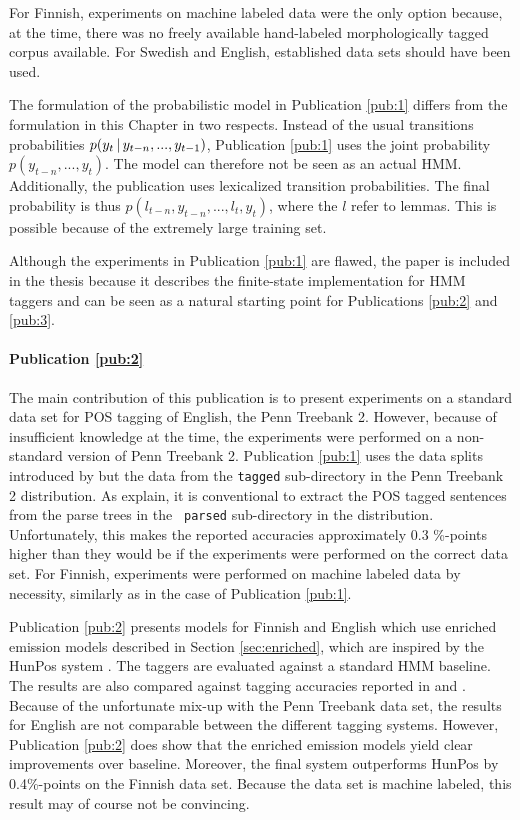 For Finnish, experiments on machine labeled data were the only option
because, at the time, there was no freely available hand-labeled
morphologically tagged corpus available. For Swedish and English,
established data sets should have been used.

The formulation of the probabilistic model in Publication \ref{pub:1}
differs from the formulation in this Chapter in two respects. Instead
of the usual transitions probabilities $p(y_{t}\mbox{$ \, | \, $} y_{t-n}, ...,
y_{t-1})$, Publication \ref{pub:1} uses the joint probability
$p(y_{t-n}, ..., y_t)$. The model can therefore not be seen as an
actual HMM. Additionally, the publication uses lexicalized transition
probabilities. The final probability is thus $p(l_{t-n}, y_{t-n}, ...,
l_t, y_t)$, where the $l$ refer to lemmas. This is possible because of
the extremely large training set.

Although the experiments in Publication \ref{pub:1} are flawed, the
paper is included in the thesis because it describes the finite-state
implementation for HMM taggers and can be seen as a natural starting
point for Publications \ref{pub:2} and \ref{pub:3}.

\paragraph{Publication \ref{pub:2}} The main contribution of this
publication is to present experiments on a standard data set for POS
tagging of English, the Penn Treebank 2. However, because of
insufficient knowledge at the time, the experiments were performed on
a non-standard version of Penn Treebank 2. Publication \ref{pub:1}
uses the data splits introduced by \cite{Collins2002} but the data
from the {\tt tagged} sub-directory in the Penn Treebank 2
distribution. As \cite{Toutanova2003} explain, it is conventional to
extract the POS tagged sentences from the parse trees in the {\tt
  parsed} sub-directory in the distribution. Unfortunately, this makes
the reported accuracies approximately 0.3 \%-points higher than they
would be if the experiments were performed on the correct data
set. For Finnish, experiments were performed on machine labeled data by
necessity, similarly as in the case of Publication \ref{pub:1}.

Publication \ref{pub:2} presents models for Finnish and English which
use enriched emission models described in Section \ref{sec:enriched},
which are inspired by the HunPos system \citep{Halacsy2007}. The
taggers are evaluated against a standard HMM baseline. The results are
also compared against tagging accuracies reported in \cite{Brants2000}
and \cite{Halacsy2007}. Because of the unfortunate mix-up with the
Penn Treebank data set, the results for English are not comparable
between the different tagging systems. However, Publication
\ref{pub:2} does show that the enriched emission models yield clear
improvements over baseline. Moreover, the final system outperforms
HunPos by 0.4\%-points on the Finnish data set. Because the data set
is machine labeled, this result may of course not be convincing.

